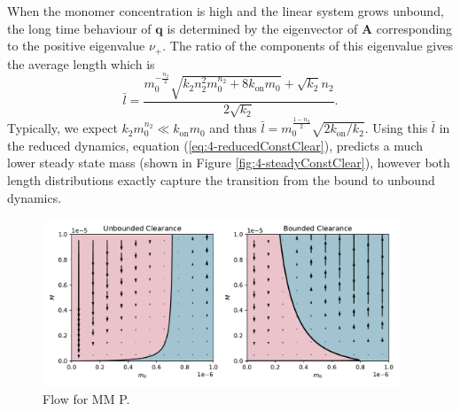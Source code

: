 When the monomer concentration is high and the linear system grows unbound, the long time behaviour of $\mathbf{q}$ is determined by the eigenvector of $\mathbf{A}$ corresponding to the positive eigenvalue $\nu_+$. The ratio of the components of this eigenvalue gives the average length which is
\begin{equation}
    \bar{l} = \frac{m_0^{-\frac{n_2}{2}} \sqrt{k_2 n_2^2 m_0^{n_2}+8 k_\text{on} m_0}+\sqrt{k_2} n_2}{2 \sqrt{k_2}}.
\end{equation}
Typically, we expect $k_2 m_0^{n_2} \ll k_\text{on} m_0$ and thus $\bar{l} = m_0^{\frac{1-n_2}{2}}\sqrt{2 k_\text{on}/k_2}$. Using this $\bar{l}$ in the reduced dynamics, equation (\ref{eq:4-reducedConstClear}), predicts a much lower steady state mass (shown in Figure \ref{fig:4-steadyConstClear}), however both length distributions exactly capture the transition from the bound to unbound dynamics.
\begin{figure}
    \centering
    \includegraphics[width=0.95\textwidth]{figures/reduced_nocol.pdf}
    \caption{Flow for MM P.}
    \label{fig:4-flowMM_P}
\end{figure}

